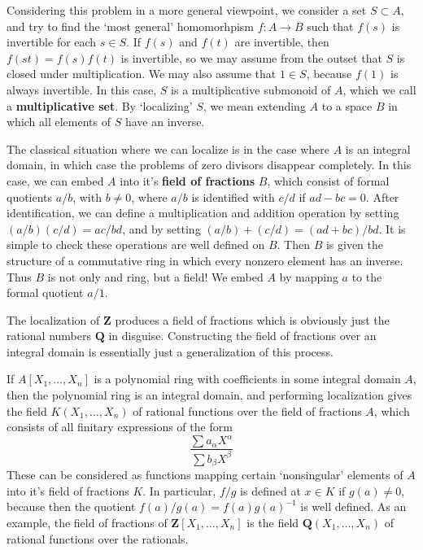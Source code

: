 Considering this problem in a more general viewpoint, we consider a set $S \subset A$, and try to find the `most general' homomorhpism $f: A \to B$ such that $f(s)$ is invertible for each $s \in S$. If $f(s)$ and $f(t)$ are invertible, then $f(st) = f(s)f(t)$ is invertible, so we may assume from the outset that $S$ is closed under multiplication. We may also assume that $1 \in S$, because $f(1)$ is always invertible. In this case, $S$ is a multiplicative submonoid of $A$, which we call a {\bf multiplicative set}. By `localizing' $S$, we mean extending $A$ to a space $B$ in which all elements of $S$ have an inverse.

The classical situation where we can localize is in the case where $A$ is an integral domain, in which case the problems of zero divisors disappear completely. In this case, we can embed $A$ into it's {\bf field of fractions} $B$, which consist of formal quotients $a/b$, with $b \neq 0$, where $a/b$ is identified with $c/d$ if $ad - bc = 0$. After identification, we can define a multiplication and addition operation by setting $(a/b)(c/d) = ac/bd$, and by setting $(a/b) + (c/d) = (ad + bc)/bd$. It is simple to check these operations are well defined on $B$. Then $B$ is given the structure of a commutative ring in which every nonzero element has an inverse. Thus $B$ is not only and ring, but a field! We embed $A$ by mapping $a$ to the formal quotient $a/1$.

\begin{example}
    The localization of $\mathbf{Z}$ produces a field of fractions which is obviously just the rational numbers $\mathbf{Q}$ in disguise. Constructing the field of fractions over an integral domain is essentially just a generalization of this process.
\end{example}

\begin{example}
    If $A[X_1, \dots, X_n]$ is a polynomial ring with coefficients in some integral domain $A$, then the polynomial ring is an integral domain, and performing localization gives the field $K(X_1, \dots, X_n)$ of rational functions over the field of fractions $A$, which consists of all finitary expressions of the form
    \[ \frac{\sum a_\alpha X^\alpha}{\sum b_\beta X^\beta} \]
    These can be considered as functions mapping certain `nonsingular' elements of $A$ into it's field of fractions $K$. In particular, $f/g$ is defined at $x \in K$ if $g(a) \neq 0$, because then the quotient $f(a)/g(a) = f(a) g(a)^{-1}$ is well defined. As an example, the field of fractions of $\mathbf{Z}[X_1, \dots, X_n]$ is the field $\mathbf{Q}(X_1, \dots, X_n)$ of rational functions over the rationals.
\end{example}

